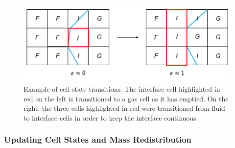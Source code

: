 \documentclass[pdftex,ms]{pittetd}
\begin{document}
\begin{figure}
\centering
\includegraphics{figs/cell-transition}
\caption{Example of cell state transitions.
The interface cell highlighted in red on the left is transitioned to a gas cell as it has emptied.
On the right, the three cells highlighted in red were transitioned from fluid to interface cells in order to keep the interface continuous.}
\label{fig:cell-transition}
\end{figure}

\subsubsection{Updating Cell States and Mass Redistribution} \label{sec:cell-updates}
\end{document}
